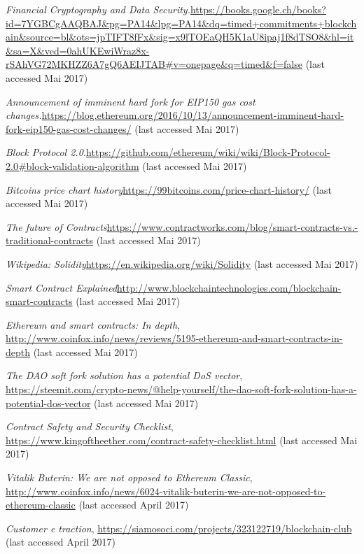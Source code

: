 \begin{thebibliography}{99}
\emph{Financial Cryptography and Data Security.}\url{https://books.google.ch/books?id=7YGBCgAAQBAJ&pg=PA14&lpg=PA14&dq=timed+commitments+blockchain&source=bl&ots=jpTIFT8fFx&sig=x9lTOEaQH5K1aU8ipaj1f8dTSO8&hl=it&sa=X&ved=0ahUKEwiWraz8x-rSAhVG72MKHZZ6A7gQ6AEIJTAB#v=onepage&q=timed&f=false} (last accessed Mai 2017)


\emph{Announcement of imminent hard fork for EIP150 gas cost changes.}\url{https://blog.ethereum.org/2016/10/13/announcement-imminent-hard-
fork-eip150-gas-cost-changes/} (last accessed Mai 2017)

\emph{Block Protocol 2.0.}\url{https://github.com/ethereum/wiki/wiki/Block-Protocol-2.0#block-validation-algorithm} (last accessed Mai 2017)

\emph{Bitcoins price chart history}\url{https://99bitcoins.com/price-chart-history/} (last accessed Mai 2017)

\emph{The future of Contracts}\url{https://www.contractworks.com/blog/smart-contracts-vs.-traditional-contracts} (last accessed Mai 2017)

\emph{Wikipedia: Solidity}\url{https://en.wikipedia.org/wiki/Solidity} (last accessed Mai 2017)

\emph{Smart Contract Explained}\url{http://www.blockchaintechnologies.com/blockchain-smart-contracts} (last accessed Mai 2017)

\emph{Ethereum and smart contracts: In depth}, \url{http://www.coinfox.info/news/reviews/5195-ethereum-and-smart-contracts-in-depth} (last accessed Mai 2017)

\emph{The DAO soft fork solution has a potential DoS vector}, \url{https://steemit.com/crypto-news/@help-yourself/the-dao-soft-fork-solution-has-a-potential-dos-vector} (last accessed Mai 2017)

\emph{Contract Safety and Security Checklist}, \url{https://www.kingoftheether.com/contract-safety-checklist.html} (last accessed Mai 2017)

\emph{Vitalik Buterin: We are not opposed to Ethereum Classic}, \url{http://www.coinfox.info/news/6024-vitalik-buterin-we-are-not-opposed-to-ethereum-classic} (last accessed April 2017)


\emph{Customer e traction}, \url{https://siamosoci.com/projects/323122719/blockchain-club} (last accessed April 2017)



\end{thebibliography}
